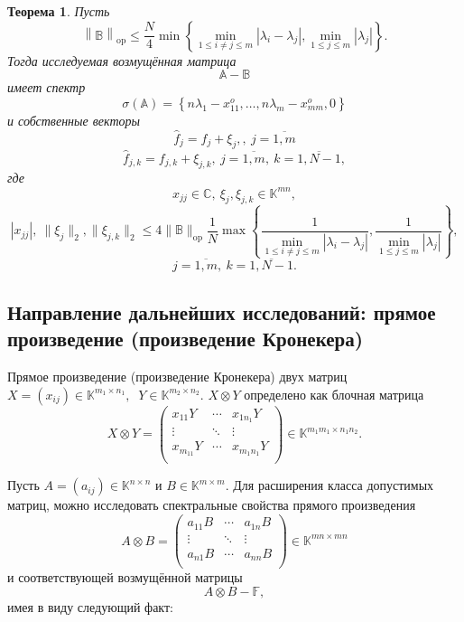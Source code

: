 \documentclass[12pt]{article}
\newtheorem{ksvthm}{Теорема}
\theoremstyle{definition}
\begin{document}
\begin{ksvthm}
    Пусть
    \[
        \left\| \mathbb{B} \right\|_{\mathrm{op}}
        \leq
        \frac{N}{4}
         \min\left\{
             \min\limits_{1\leq i{\neq}j \leq m }{|\lambda_i - \lambda_j|},
             \min\limits_{1\leq j \leq m}{|\lambda_j|}
         \right\}.
        \]
    Тогда исследуемая возмущённая матрица
    \[
        \mathbb{A} - \mathbb{B}
        \]
    имеет спектр
    \[
        \sigma\left(\mathbb{A}\right) =
        \left\{
            n\lambda_1 - x_{11}^o, \ldots, n\lambda_m - x_{mm}^o, 0
        \right\}
        \]
    и собственные векторы
    \[
        \hat{f}_j = f_j + \xi_j,
        ,\ j{=}\overline{1,m}
        \]
    \[
        \hat{f}_{j,k} = f_{j,k} + \xi_{j,k},
        \ j{=}\overline{1,m},
        \ k{=}\overline{1,N{-}1},
        \]
    где
    \[
        x_{jj}{\in}\mathbb{C},
        \ \xi_j, \xi_{j,k}{\in}\mathbb{K}^{mn},
        \]
    \[
        |x_{jj}|,\ \|\xi_j\|_2, \|\xi_{j,k}\|_2 \leq
        4 \|\mathbb{B}\|_{\mathrm{op}}
          \frac1N
          \max\left\{
          \frac{1}{
              \min\limits_{1\leq i{\neq}j \leq m }{|\lambda_i - \lambda_j|}},
          \frac{1}{
              \min\limits_{1\leq j \leq m}{|\lambda_j|}}
          \right\},
        \]
    \[
        j{=}\overline{1,m},
        \ k{=}\overline{1,N{-}1}.
        \]
\end{ksvthm}
\subsection*{Направление дальнейших исследований: прямое произведение (произведение Кронекера)}
Прямое произведение (произведение Кронекера)
    двух матриц
    \( X{=}(x_{ij}){\in}\mathbb{K}^{m_1{\times}n_1},\ \)
    \( Y{\in}\mathbb{K}^{m_2{\times}n_2} \).
    \( X\otimes Y \)
    определено как блочная матрица
\[
    X\otimes Y =
    \begin{pmatrix}
        x_{11} Y & \cdots & x_{1n_1} Y \\
        \vdots   & \ddots & \vdots \\
        x_{m_11} Y & \cdots & x_{m_1n_1} Y \\
    \end{pmatrix}\in\mathbb{K}^{m_1m_1\times n_1n_2}.
    \]

Пусть \( A{=}(a_{ij}){\in}\mathbb{K}^{n\times n} \)
    и \( B\in\mathbb{K}^{m\times m} \).
Для расширения класса допустимых матриц,
    можно исследовать спектральные свойства прямого произведения
    \[
        A\otimes B =
        \begin{pmatrix}
            a_{11} B & \cdots & a_{1n} B \\
            \vdots   & \ddots & \vdots \\
            a_{n1} B & \cdots & a_{nn} B \\
        \end{pmatrix}\in\mathbb{K}^{mn\times mn}
        \]
    и соответствующей возмущённой матрицы
    \begin{equation}\label{ksv:disturbkron}
        A\otimes B - \mathbb{F},
    \end{equation}
    имея в виду следующий факт:
\end{document}
